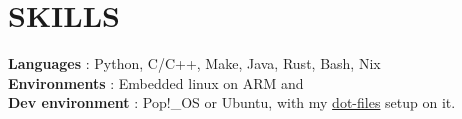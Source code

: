 \section{SKILLS}
\begin{itemize}[leftmargin=0in, label={}]
    \small{\item{
                    \textbf{Languages} {: Python, C/C++, Make, Java, Rust, Bash, Nix}\vspace{2pt} \\
                    \textbf{Environments} {: Embedded linux on ARM and}\vspace{2pt} \\
                    \textbf{Dev environment} {: Pop!\_OS or Ubuntu, with my \href{https://github.com/colefuerth/dot-files}{dot-files} setup on it.}\vspace{2pt}
              }}
\end{itemize}
